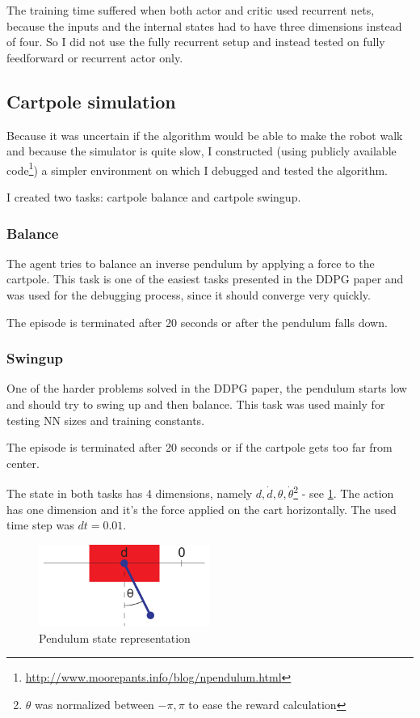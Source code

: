 The training time suffered when both actor and critic used recurrent nets, because the inputs and the internal states had to have three dimensions instead of four. So I did not use the fully recurrent setup and instead tested on fully feedforward or recurrent actor only.


\subsection{Cartpole simulation}

Because it was uncertain if the algorithm would be able to make the robot walk and because the simulator is quite slow, I constructed (using publicly available code\footnote{\url{http://www.moorepants.info/blog/npendulum.html}}) a simpler environment on which I debugged and tested the algorithm.

I created two tasks: cartpole balance and cartpole swingup.

\subsubsection{Balance} 
The agent tries to balance an inverse pendulum by applying a force to the cartpole. This task is one of the easiest tasks presented in the DDPG paper and was used for the debugging process, since it should converge very quickly.

The episode is terminated after 20 seconds or after the pendulum falls down.

\subsubsection{Swingup}
One of the harder problems solved in the DDPG paper, the pendulum starts low and should try to swing up and then balance. This task was used mainly for testing NN sizes and training constants.

The episode is terminated after 20 seconds or if the cartpole gets too far from center.

\medskip

The state in both tasks has 4 dimensions, namely $d, \dot{d}, \theta, \dot{\theta}$\footnote{$\theta$ was normalized between $-\pi, \pi$ to ease the reward calculation} - see \ref{fig:pendulum}. The action has one dimension and it's the force applied on the cart horizontally. The used time step was $dt=0.01$.

\begin{figure}[htbp]
\includegraphics[width=0.5\textwidth]{images/ddpg/pendulum.pdf}
\caption{Pendulum state representation}
\label{fig:pendulum}
\end{figure}

